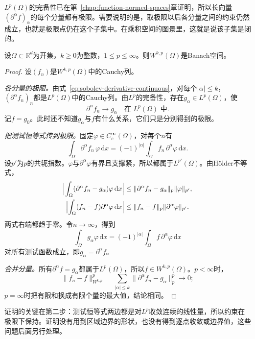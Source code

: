 $L^p(\Omega)$的完备性已在第~\ref{chap:function-normed-spaces}章证明，所以长向量$(\partial^\alpha f)_\alpha$的每个分量都有极限。需要说明的是，取极限以后各分量之间的约束仍然成立，也就是极限点仍在这个子集中。在乘积空间的图景里，这就是说该子集是闭的。

\begin{theorem}[Sobolev空间的完备性]
\label{thm:sobolev-complete}
设$\Omega\subset\mathbb R^d$为开集，$k\geq0$为整数，$1\leq p\leq\infty$。则$W^{k,p}(\Omega)$是Banach空间。
\end{theorem}

\begin{proof}
设$(f_n)$是$W^{k,p}(\Omega)$中的Cauchy列。

\emph{各分量的极限。}由式~\eqref{eq:sobolev-derivative-continuous}，对每个$|\alpha|\leq k$，$(\partial^\alpha f_n)_n$都是$L^p(\Omega)$中的Cauchy列。由$L^p$的完备性，存在$g_\alpha\in L^p(\Omega)$，使
\[
\partial^\alpha f_n\to g_\alpha\quad\text{在 }L^p(\Omega)\text{ 中}.
\]
记$f=g_0$。此时还不知道$g_\alpha$与$f$有什么关系，它们只是分别得到的极限。

\emph{把测试恒等式传到极限。}固定$\varphi\in C_c^\infty(\Omega)$，对每个$n$有
\[
\int_\Omega\partial^\alpha f_n\,\varphi\,\mathrm dx=(-1)^{|\alpha|}\int_\Omega f_n\,\partial^\alpha\varphi\,\mathrm dx .
\]
设$p'$为$p$的共轭指数。$\varphi$与$\partial^\alpha\varphi$有界且支撑紧，所以都属于$L^{p'}(\Omega)$。由Hölder不等式，
\[
\begin{aligned}
\Bigl|\int_\Omega(\partial^\alpha f_n-g_\alpha)\varphi\,\mathrm dx\Bigr|
&\leq\lVert\partial^\alpha f_n-g_\alpha\rVert_p\lVert\varphi\rVert_{p'},\\
\Bigl|\int_\Omega(f_n-f)\partial^\alpha\varphi\,\mathrm dx\Bigr|
&\leq\lVert f_n-f\rVert_p\lVert\partial^\alpha\varphi\rVert_{p'}.
\end{aligned}
\]
两式右端都趋于零。令$n\to\infty$，得到
\[
\int_\Omega g_\alpha\varphi\,\mathrm dx=(-1)^{|\alpha|}\int_\Omega f\,\partial^\alpha\varphi\,\mathrm dx
\]
对所有测试函数成立，即$g_\alpha=\partial^\alpha f$。

\emph{合并分量。}所有$\partial^\alpha f=g_\alpha$都属于$L^p(\Omega)$，所以$f\in W^{k,p}(\Omega)$。$p<\infty$时，
\[
\lVert f_n-f\rVert_{W^{k,p}}^p=\sum_{|\alpha|\leq k}\lVert\partial^\alpha f_n-g_\alpha\rVert_p^p\to0;
\]
$p=\infty$时把有限和换成有限个量的最大值，结论相同。
\end{proof}

证明的关键在第二步：测试恒等式两边都是对$L^p$收敛连续的线性量，所以约束在极限下保持。证明没有用到区域边界的形状，也没有得到逐点收敛或边界值，这些问题后面另行处理。

